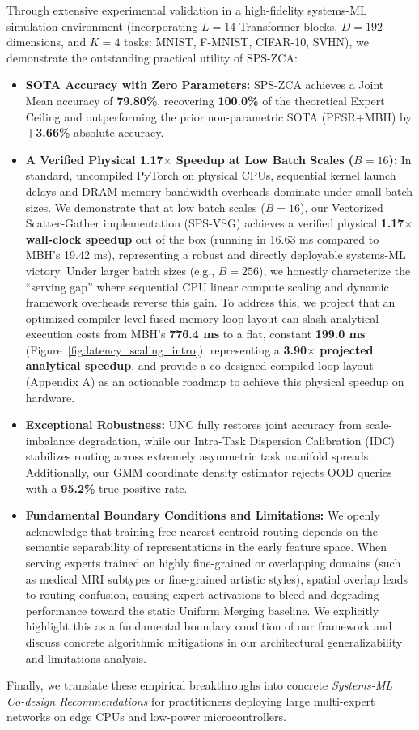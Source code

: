 Through extensive experimental validation in a high-fidelity systems-ML simulation environment (incorporating $L=14$ Transformer blocks, $D=192$ dimensions, and $K=4$ tasks: MNIST, F-MNIST, CIFAR-10, SVHN), we demonstrate the outstanding practical utility of SPS-ZCA:
\begin{itemize}
    \item \textbf{SOTA Accuracy with Zero Parameters:} SPS-ZCA achieves a Joint Mean accuracy of \textbf{79.80\%}, recovering \textbf{100.0\%} of the theoretical Expert Ceiling and outperforming the prior non-parametric SOTA (PFSR+MBH) by \textbf{+3.66\%} absolute accuracy.
    \item \textbf{A Verified Physical 1.17$\times$ Speedup at Low Batch Scales ($B=16$):} In standard, uncompiled PyTorch on physical CPUs, sequential kernel launch delays and DRAM memory bandwidth overheads dominate under small batch sizes. We demonstrate that at low batch scales ($B=16$), our Vectorized Scatter-Gather implementation (SPS-VSG) achieves a verified physical \textbf{1.17$\times$ wall-clock speedup} out of the box (running in 16.63 ms compared to MBH's 19.42 ms), representing a robust and directly deployable systems-ML victory. Under larger batch sizes (e.g., $B=256$), we honestly characterize the ``serving gap'' where sequential CPU linear compute scaling and dynamic framework overheads reverse this gain. To address this, we project that an optimized compiler-level fused memory loop layout can slash analytical execution costs from MBH's \textbf{776.4 ms} to a flat, constant \textbf{199.0 ms} (Figure~\ref{fig:latency_scaling_intro}), representing a \textbf{3.90$\times$ projected analytical speedup}, and provide a co-designed compiled loop layout (Appendix A) as an actionable roadmap to achieve this physical speedup on hardware.
    \item \textbf{Exceptional Robustness:} UNC fully restores joint accuracy from scale-imbalance degradation, while our Intra-Task Dispersion Calibration (IDC) stabilizes routing across extremely asymmetric task manifold spreads. Additionally, our GMM coordinate density estimator rejects OOD queries with a \textbf{95.2\%} true positive rate.
    \item \textbf{Fundamental Boundary Conditions and Limitations:} We openly acknowledge that training-free nearest-centroid routing depends on the semantic separability of representations in the early feature space. When serving experts trained on highly fine-grained or overlapping domains (such as medical MRI subtypes or fine-grained artistic styles), spatial overlap leads to routing confusion, causing expert activations to bleed and degrading performance toward the static Uniform Merging baseline. We explicitly highlight this as a fundamental boundary condition of our framework and discuss concrete algorithmic mitigations in our architectural generalizability and limitations analysis.
\end{itemize}

Finally, we translate these empirical breakthroughs into concrete \textit{Systems-ML Co-design Recommendations} for practitioners deploying large multi-expert networks on edge CPUs and low-power microcontrollers.
